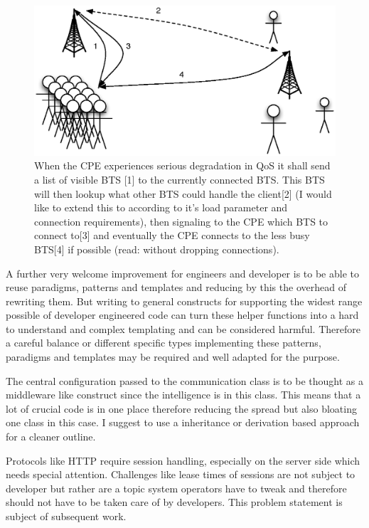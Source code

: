 \documentclass[twocolumn,english]{IEEEtran}
\theoremstyle{plain}
\theoremstyle{plain}
\begin{document}
\begin{figure}[h]
\includegraphics[width=\columnwidth]{Handover-to-less-frequented-cell.eps}
\caption{When the CPE experiences serious degradation in QoS it shall send a
list of visible BTS [1] to the currently connected BTS. This BTS will then
lookup what other BTS could handle the client[2] (I would like to extend this
to according to it's load parameter and connection requirements), then
signaling to the CPE which BTS to connect to[3] and eventually the CPE
connects to the less busy BTS[4] if possible (read: without dropping
connections).}
\label{fig:handover}
\end{figure}

A further very welcome improvement for engineers and developer is to be able
to reuse paradigms, patterns and templates and reducing by this the overhead
of rewriting them. But writing to general constructs for supporting the
widest range possible of developer engineered code can turn these helper
functions into a hard to understand and complex templating and can be
considered harmful. Therefore a careful balance or different specific types
implementing these patterns, paradigms and templates may be required and well
adapted for the purpose.

The central configuration passed to the communication class is to be thought
as a middleware like construct since the intelligence is in this
class. This means that a lot of crucial code is in one place therefore
reducing the spread but also bloating one class in this case. I suggest to
use a inheritance or derivation based approach for a cleaner outline.

Protocols like HTTP require session handling, especially on the server side
which needs special attention. Challenges like lease times of sessions are
not subject to developer but rather are a topic system operators have to
tweak and therefore should not have to be taken care of by developers. This
problem statement is subject of subsequent work.
\end{document}
